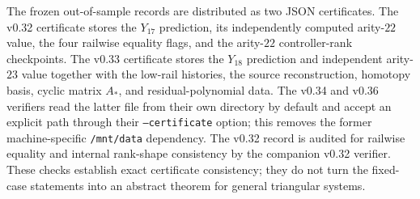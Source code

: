 \documentclass[11pt]{amsart}
\begin{document}
The frozen out-of-sample records are distributed as two JSON certificates.  The v0.32 certificate stores the $Y_{17}$ prediction, its independently computed arity-$22$ value, the four railwise equality flags, and the arity-$22$ controller-rank checkpoints.  The v0.33 certificate stores the $Y_{18}$ prediction and independent arity-$23$ value together with the low-rail histories, the source reconstruction, homotopy basis, cyclic matrix $A_*$, and residual-polynomial data.  The v0.34 and v0.36 verifiers read the latter file from their own directory by default and accept an explicit path through their \texttt{--certificate} option; this removes the former machine-specific \texttt{/mnt/data} dependency.  The v0.32 record is audited for railwise equality and internal rank-shape consistency by the companion v0.32 verifier.  These checks establish exact certificate consistency; they do not turn the fixed-case statements into an abstract theorem for general triangular systems.
\end{document}
